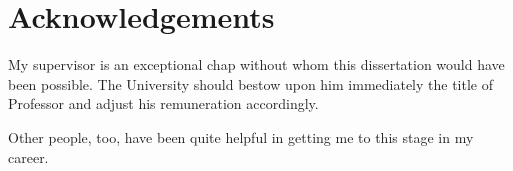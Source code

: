\chapter{Acknowledgements}
  My supervisor is an exceptional chap without whom this dissertation
  would have been possible. The University should bestow upon him
  immediately the title of Professor and adjust his remuneration
  accordingly.

  Other people, too, have been quite helpful in getting me to this
  stage in my career.
